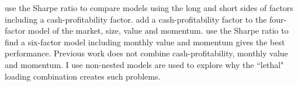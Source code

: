 \textcite{fama2016choosing} use the Sharpe ratio to compare models using the
long and short sides of factors including a cash-profitability factor.
\textcite{ball2016accruals} add a cash-profitability factor to the four-factor
model of the market, size, value and momentum.
\textcite{barillas2015comparing} use the Sharpe ratio to find a six-factor
model including monthly value and momentum gives the best performance.
Previous work does not combine cash-profitability, monthly value and momentum.
I use non-nested models are used to explore why the 
``lethal" loading combination creates such problems.

